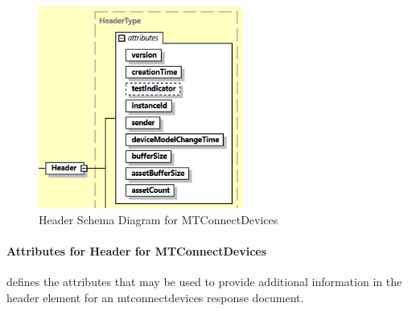 \documentclass{mtconnect}	%
\begin{document}
\begin{figure}[ht]
  \centering
  \includegraphics[width=0.6\textwidth]{figures/header-schema-diagram-for-mtconnectdevices.png}
  \caption{Header Schema Diagram for MTConnectDevices}
  \label{fig:header-schema-diagram-for-mtconnectdevices}
\end{figure}

\FloatBarrier

\paragraph{Attributes for Header for MTConnectDevices}\mbox{}

 defines the attributes that may be used to provide additional information in the \gls{header} element for an \gls{mtconnectdevices response document}. 
\end{document}
